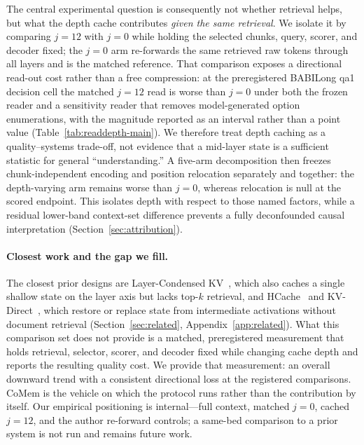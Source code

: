 The central experimental question is consequently not whether retrieval helps,
but what the depth cache contributes \emph{given the same retrieval}.  We
isolate it by comparing $j=12$ with $j=0$ while holding the selected chunks,
query, scorer, and decoder fixed; the $j=0$ arm re-forwards the same retrieved
raw tokens through all layers and is the matched reference.  That comparison
exposes a directional read-out cost rather than a free compression: at the
preregistered BABILong qa1 decision cell the matched $j{=}12$ read is worse than
$j{=}0$ under both the frozen reader and a sensitivity reader that removes
model-generated option enumerations, with the magnitude reported as an interval
rather than a point value (Table~\ref{tab:readdepth-main}).  We therefore treat
depth caching as a quality--systems trade-off, not evidence that a mid-layer
state is a sufficient statistic for general ``understanding.''  A five-arm
decomposition then freezes chunk-independent encoding and position relocation
separately and together: the depth-varying arm remains worse than $j=0$, whereas
relocation is null at the scored endpoint.  This isolates depth with respect to
those named factors, while a residual lower-band context-set difference prevents a
fully deconfounded causal interpretation (Section~\ref{sec:attribution}).

\paragraph{Closest work and the gap we fill.}
The closest prior designs are Layer-Condensed KV~\citep{lckv}, which also caches
a single shallow state on the layer axis but lacks top-$k$ retrieval, and
HCache~\citep{hcache} and KV-Direct~\citep{kvdirect}, which restore or replace
state from intermediate activations without document retrieval
(Section~\ref{sec:related}, Appendix~\ref{app:related}).  What this comparison
set does not provide is a matched, preregistered measurement that holds retrieval,
selector, scorer, and decoder fixed while changing cache depth and reports the
resulting quality cost.  We provide that measurement: an overall downward trend
with a consistent directional loss at the registered comparisons.  CoMem is the
vehicle on which the protocol runs rather than the contribution by itself.  Our
empirical positioning is internal---full
context, matched $j{=}0$, cached $j{=}12$, and the author re-forward controls; a
same-bed comparison to a prior system is not run and remains future work.

